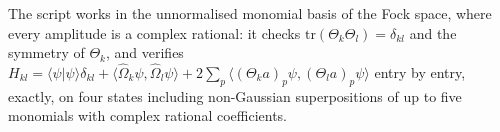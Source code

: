 The script works in the unnormalised monomial basis of the Fock space, where every amplitude is a complex rational: it checks $\mathrm{tr}(\Theta_{k}\Theta_{l}) = \delta_{kl}$ and the symmetry of $\Theta_{k}$, and verifies $H_{kl} = \langle\psi|\psi\rangle\delta_{kl} + \langle\hat\Omega_{k}\psi, \hat\Omega_{l}\psi\rangle + 2\sum_{p}\langle(\Theta_{k}a)_{p}\psi, (\Theta_{l}a)_{p}\psi\rangle$ entry by entry, exactly, on four states including non-Gaussian superpositions of up to five monomials with complex rational coefficients.
